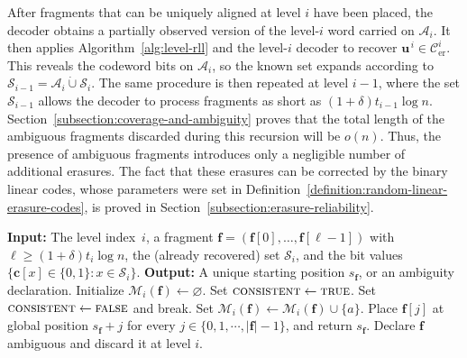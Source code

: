 \documentclass[journal,letterpaper,onecolumn,11pt]{IEEEtran}
\newcommand{\cA}{\mathcal{A}}
\newcommand{\cC}{\mathcal{C}}
\newcommand{\cM}{\mathcal{M}}
\newcommand{\cS}{\mathcal{S}}
\newcommand{\boldc}{\mathbf{c}}
\newcommand{\boldf}{\mathbf{f}}
\newcommand{\boldu}{\mathbf{u}}
\begin{document}
After fragments that can be uniquely aligned at level \(i\) have been placed, the decoder obtains a partially observed version of the level-\(i\) word carried
on \(\cA_i\).
It then applies Algorithm~\ref{alg:level-rll} and the level-\(i\) decoder to recover \(\boldu^{\,i}\in\cC_{\mathrm{er}}^i\). 
This reveals the codeword bits on \(\cA_i\), so the known set expands according to \(\cS_{i-1}=\cA_i\mathbin{\dot\cup}\cS_i\). 
The same procedure is then repeated at level \(i-1\), where the set \(\cS_{i-1}\) allows the decoder to process fragments as short as \((1+\delta)t_{i-1}\log n\).
Section~\ref{subsection:coverage-and-ambiguity} proves that the total
length of the ambiguous fragments discarded during this recursion will be $o(n)$.
Thus, the presence of ambiguous fragments introduces only a negligible number of additional erasures.
The fact that these erasures can be corrected by the binary linear codes, whose parameters were set in Definition~\ref{definition:random-linear-erasure-codes}, is proved in Section~\ref{subsection:erasure-reliability}.

\begin{algorithm}[H]
\caption{Level-\(i\) alignment using recycled pilot bits}
\label{alg:recycled-pilot-alignment}
\begin{algorithmic}[1]
\STATE \textbf{Input:} The level index~$i$, a fragment
\(\boldf=(\boldf[0],\ldots,\boldf[\ell-1])\) with
\(\ell\geq(1+\delta)t_i\log n\), the (already recovered) set \(\cS_i\), and the
bit values \(\{\boldc[x]\in\{0,1\}:x\in\cS_i\}\). 
\STATE \textbf{Output:} A unique starting position \(s_{\boldf}\), or an
ambiguity declaration.
\STATE Initialize \(\cM_i(\boldf)\gets\varnothing\).
    \STATE Set \(\textsc{consistent}\gets\textsc{true}\).
        \IF{\(a+j\in\cS_i\) and \(\boldf[j]\neq \boldc[a+j]\)}
            \STATE Set \(\textsc{consistent}\gets\textsc{false}\) and break.
        \ENDIF
    \ENDFOR
        \STATE Set
        \(\cM_i(\boldf)\gets\cM_i(\boldf)\cup\{a\}\).
    \ENDIF
\ENDFOR
\IF{\(\cM_i(\boldf)=\{s_{\boldf}\}\)}
    \STATE Place \(\boldf[j]\) at global position \(s_{\boldf}+j\) for every
    \(j\in\{0,1,\cdots,|\boldf|-1\}\), and return \(s_{\boldf}\).
\ELSE
    \STATE Declare \(\boldf\) ambiguous and discard it at level \(i\).
\ENDIF
\end{algorithmic}
\end{algorithm}
\end{document}
